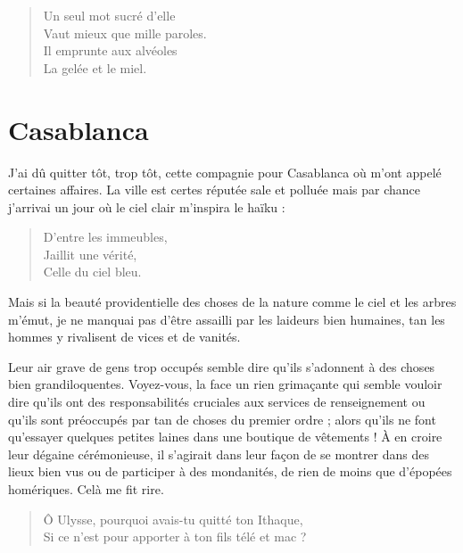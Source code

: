 \begin{verse}
Un seul mot sucré d’elle\\
Vaut mieux que mille paroles.\\
Il emprunte aux alvéoles\\
La gelée et le miel.
\end{verse}

\afterpage{}
\section*{Casablanca}
\begin{prose}
J’ai dû quitter tôt, trop tôt, cette compagnie pour Casablanca où m’ont appelé certaines affaires. La ville est certes réputée sale et polluée mais par chance j’arrivai un jour où le ciel clair m’inspira le haïku :
\end{prose}

\begin{verse}
D’entre les immeubles,\\
Jaillit une vérité,\\
Celle du ciel bleu.
\end{verse}

\begin{prose}
Mais si la beauté providentielle des choses de la nature comme le ciel et les arbres m’émut, je ne manquai pas d’être assailli par les laideurs bien humaines, tan les hommes y rivalisent de vices et de vanités. 

Leur air grave de gens trop occupés semble dire qu’ils s’adonnent à des choses bien grandiloquentes. Voyez-vous, la face un rien grimaçante qui semble vouloir dire qu’ils ont des responsabilités cruciales aux services de renseignement ou qu’ils sont préoccupés par tan de choses du premier ordre ; alors qu’ils ne font qu’essayer quelques petites laines dans une boutique de vêtements ! À en croire leur dégaine cérémonieuse, il s’agirait dans leur façon de se montrer dans des lieux bien vus ou de participer à des mondanités, de rien de moins que d’épopées homériques. Celà  me fit rire.
\end{prose}

\begin{verse}
Ô Ulysse, pourquoi avais-tu quitté ton Ithaque,\\
Si ce n’est pour apporter à ton fils télé et mac ?
\end{verse}

